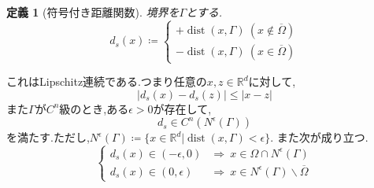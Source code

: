 \documentclass[a4,12pt]{article}
\newtheorem{dfn}{定義}
\begin{document}
\begin{dfn}[符号付き距離関数]
境界を$\Gamma$とする.\[
d_s(x)\coloneqq
\begin{cases}
+\operatorname{dist}(x,\Gamma)\ (x\notin\overline{\Omega})\\
-\operatorname{dist}(x,\Gamma)\ (x\in\overline{\Omega})
\end{cases}
\]\end{dfn}
\medskip
これはLipschitz連続である.つまり任意の$x,z\in\mathbb{R}^d$に対して,
\begin{equation}
    |d_s(x)-d_s(z)|\le|x-z|
\end{equation}
また$\Gamma$が$C^n$級のとき,ある$\epsilon>0$が存在して,
\begin{equation}
d_s\in C^n(N^\epsilon (\Gamma))
\end{equation}
を満たす.ただし,$N^\epsilon(\Gamma)\coloneqq\{x\in\mathbb{R}^d|\operatorname{dist}(x,\Gamma)<\epsilon\}$.
また次が成り立つ.
\begin{equation}\begin{cases}
    d_s(x)\in(-\epsilon,0)&\Rightarrow\ x\in\Omega\cap N^\epsilon(\Gamma)\\
    d_s(x)\in(0,\epsilon)&\Rightarrow\ x\in N^\epsilon(\Gamma)\backslash \overline{\Omega}
\end{cases}\end{equation}
\end{document}
